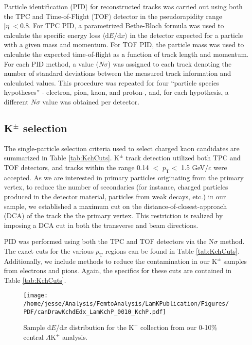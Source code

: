 \documentclass[ALICE,manyauthors]{cernphprep}
\newcommand{\pt}{$p_{\mathrm{T}}$\xspace}
\newcommand{\KchP}{$\mathrm{K^{+}}$\xspace}
\newcommand{\Kpm}{$\mathrm{K^{\pm}}$\xspace}
\newcommand{\LamKchP}{$\Lambda\mathrm{K^{+}}$\xspace}
\begin{document}
Particle identification (PID) for reconstructed tracks was carried out using both the TPC and Time-of-Flight (TOF) detector \cite{Abelev:2014ffa, Akindinov:2013tea} in the pseudorapidity range $|\eta| < 0.8$.  
For TPC PID, a parametrized Bethe-Bloch formula was used to calculate the specific energy loss $\langle \mathrm{d}E/\mathrm{d}x \rangle$ in the detector expected for a particle with a given mass and momentum.  
For TOF PID, the particle mass was used to calculate the expected time-of-flight as a function of track length and momentum.  
For each PID method, a value ($N\sigma$) was assigned to each track denoting the number of standard deviations between the measured track information and calculated values.  
This procedure was repeated for four ``particle species hypotheses'' - electron, pion, kaon, and proton-, and, for each hypothesis, a different $N\sigma$ value was obtained per detector.


\subsection{K$^{\pm}$ selection}
\label{sec:KchSelection}
The single-particle selection criteria used to select charged kaon candidates are summarized in Table \ref{tab:KchCuts}.
\Kpm track detection utilized both TPC and TOF detectors, and tracks within the range 0.14 $<$ \pt $<$ 1.5 GeV/$c$ were accepted.
As we are interested in primary particles originating from the primary vertex, to reduce the number of secondaries (for instance, charged particles produced in the detector material, particles from weak decays, etc.) in our sample, we established a maximum cut on the distance-of-closest-approach (DCA) of the track the the primary vertex.
This restriction is realized by imposing a DCA cut in both the transverse and beam directions.

PID was performed using both the TPC and TOF detectors via the $\mathrm{N}\sigma$ method.  
The exact cuts for the various \pt regions can be found in Table \ref{tab:KchCuts}.  
Additionally, we include methods to reduce the contamination in our \Kpm samples from electrons and pions.  Again, the specifics for these cuts are contained in Table \ref{tab:KchCuts}.


\begin{figure}[h]
 \centering
 \texttt{[image: /home/jesse/Analysis/FemtoAnalysis/LamKPublication/Figures/PDF/canDrawKchdEdx\_LamKchP\_0010\_KchP.pdf]}%
 \caption{\label{fig:KchPdEdx} Sample d$E$/d$x$ distribution for the \KchP collection from our 0-10\% central \LamKchP analysis.}
\end{figure}
\end{document}

